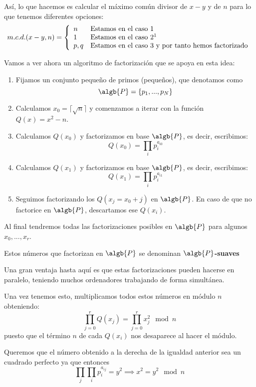Así, lo que hacemos es calcular el máximo común divisor de $x-y$ y de $n$ para lo que tenemos diferentes opciones:
\[m.c.d.(x-y,n) = \left\{ \begin{array}{ll}
             n &   \text{Estamos en el caso 1} \\
             1 &   \text{Estamos en el caso 2}\footnotemark\\
             p,q & \text{Estamos en el caso 3 y por tanto hemos factorizado}
             \end{array}\right.\]


Vamos a ver ahora un algoritmo de factorización que se apoya en esta idea:
\begin{mdframed}
\begin{enumerate}
\item Fijamos un conjunto pequeño de primos (pequeños), que denotamos como
\[\algb{P} = \{p_1,...,p_N\}\]

\item Calculamos $x_0=\lceil\sqrt{n}\rceil$ y comenzamos a iterar con la función $Q(x)=x^2-n$.

\item Calculamos $Q(x_0)$ y factorizamos en base $\algb{P}$, es decir, escribimos:
\[Q(x_0) = \prod_i p_i^{a_{i0}}\]

\item Calculamos $Q(x_1)$ y factorizamos en base $\algb{P}$, es decir, escribimos:
\[Q(x_1) = \prod_i p_i^{a_{i1}}\]

\item Seguimos factorizando los $Q(x_j=x_0+j)$ en $\algb{P}$. En caso de que no factorice en $\algb{P}$, descartamos ese $Q(x_i)$.
\end{enumerate}

Al final tendremos todas las factorizaciones posibles en $\algb{P}$ para algunos $x_0,...,x_r$.

Estos números que factorizan en $\algb{P}$ se denominan \textbf{$\algb{P}$-suaves}

\obs Una gran ventaja hasta aquí es que estas factorizaciones pueden hacerse en paralelo, teniendo muchos ordenadores trabajando de forma simultánea.

Una vez tenemos esto, multiplicamos todos estos números en módulo $n$ obteniendo:
\[\prod_{j=0}^rQ(x_j)=\prod_{j=0}^rx_j^2 \mod n\]
puesto que el término $n$ de cada $Q(x_i)$ nos desaparece al hacer el módulo.

Queremos que el número obtenido a la derecha de la igualdad anterior sea un cuadrado perfecto ya que entonces
\[\prod_j\prod_ip_i^{a_{ij}} = y^2 \implies x^2 = y^2 \mod n\]


\end{mdframed}
